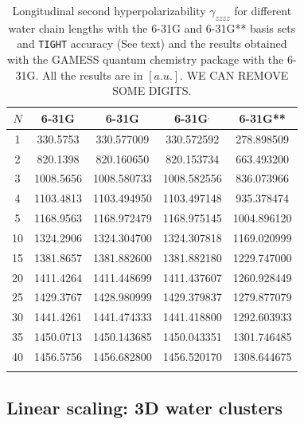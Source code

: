 \documentclass[prl,aps,twocolumn,showpacs,twocolumngrid,superbib]{revtex4}
\begin{document}
\begin{table}
  \centering
  \caption{\protect
    Longitudinal second hyperpolarizability $\gamma_{zzzz}$
    for different water chain lengths with the 6-31G and 6-31G** basis sets
    and {\tt TIGHT} accuracy (See text) and the results obtained with
    the GAMESS quantum chemistry package \cite{gamess} with the 6-31G. 
    All the results are in $[a.u.]$.
    WE CAN REMOVE SOME DIGITS.
  }\label{tab:Gamma_1D_Values}
  \begin{tabular}{ccccc}
    \toprule
    $N$ &\multicolumn{1}{c}{6-31G\footnotemark[1]}
    &\multicolumn{1}{c}{6-31G\footnotemark[2]}
    &\multicolumn{1}{c}{6-31G\footnotemark[2]$^,$\footnotemark[3]}
    &\multicolumn{1}{c}{6-31G**\footnotemark[2]}\\
    \hline
     1 &  330.5753 &  330.577009 &  330.572592 &  278.898509 \\
     2 &  820.1398 &  820.160650 &  820.153734 &  663.493200 \\
     3 & 1008.5656 & 1008.580733 & 1008.582556 &  836.073966 \\
     4 & 1103.4813 & 1103.494950 & 1103.497148 &  935.378474 \\
     5 & 1168.9563 & 1168.972479 & 1168.975145 & 1004.896120 \\
    10 & 1324.2906 & 1324.304700 & 1324.307818 & 1169.020999 \\
    15 & 1381.8657 & 1381.882600 & 1381.882180 & 1229.747000 \\
    20 & 1411.4264 & 1411.448699 & 1411.437607 & 1260.928449 \\
    25 & 1429.3767 & 1428.980999 & 1429.379837 & 1279.877079 \\
    30 & 1441.4261 & 1441.474333 & 1441.418800 & 1292.603933 \\
    35 & 1450.0713 & 1450.143685 & 1450.043351 & 1301.746485 \\
    40 & 1456.5756 & 1456.682800 & 1456.520170 & 1308.644675 \\
    \botrule
  \end{tabular}
\end{table}


\subsection{Linear scaling: 3D water clusters}
\end{document}
